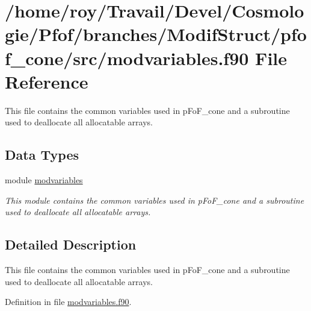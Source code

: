 \hypertarget{pfof__cone_2src_2modvariables_8f90}{\section{/home/roy/\-Travail/\-Devel/\-Cosmologie/\-Pfof/branches/\-Modif\-Struct/pfof\-\_\-cone/src/modvariables.f90 File Reference}
\label{pfof__cone_2src_2modvariables_8f90}
}


This file contains the common variables used in p\-Fo\-F\-\_\-cone and a subroutine used to deallocate all allocatable arrays.  


\subsection*{Data Types}
\begin{DoxyCompactItemize}
\item 
module \hyperlink{classmodvariables}{modvariables}
\begin{DoxyCompactList}\small\item\em This module contains the common variables used in p\-Fo\-F\-\_\-cone and a subroutine used to deallocate all allocatable arrays. \end{DoxyCompactList}\end{DoxyCompactItemize}


\subsection{Detailed Description}
This file contains the common variables used in p\-Fo\-F\-\_\-cone and a subroutine used to deallocate all allocatable arrays. 

Definition in file \hyperlink{pfof__cone_2src_2modvariables_8f90_source}{modvariables.\-f90}.

